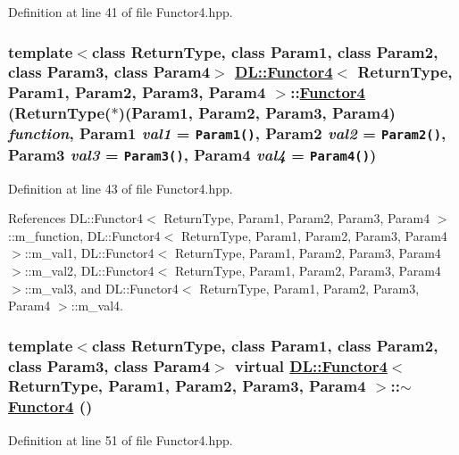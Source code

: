 Definition at line 41 of file Functor4.hpp.\hypertarget{classDL_1_1Functor4_a0}{
\subsubsection[Functor4]{\setlength{\rightskip}{0pt plus 5cm}template$<$class Return\-Type, class Param1, class Param2, class Param3, class Param4$>$ \hyperlink{classDL_1_1Functor4}{DL::Functor4}$<$ Return\-Type, Param1, Param2, Param3, Param4 $>$::\hyperlink{classDL_1_1Functor4}{Functor4} (Return\-Type($\ast$)(Param1, Param2, Param3, Param4) {\em function}, Param1 {\em val1} = {\tt Param1()}, Param2 {\em val2} = {\tt Param2()}, Param3 {\em val3} = {\tt Param3()}, Param4 {\em val4} = {\tt Param4()})}}
\label{classDL_1_1Functor4_a0}




Definition at line 43 of file Functor4.hpp.

References DL::Functor4$<$ Return\-Type, Param1, Param2, Param3, Param4 $>$::m\_\-function, DL::Functor4$<$ Return\-Type, Param1, Param2, Param3, Param4 $>$::m\_\-val1, DL::Functor4$<$ Return\-Type, Param1, Param2, Param3, Param4 $>$::m\_\-val2, DL::Functor4$<$ Return\-Type, Param1, Param2, Param3, Param4 $>$::m\_\-val3, and DL::Functor4$<$ Return\-Type, Param1, Param2, Param3, Param4 $>$::m\_\-val4.\hypertarget{classDL_1_1Functor4_a1}{
\subsubsection[$\sim$Functor4]{\setlength{\rightskip}{0pt plus 5cm}template$<$class Return\-Type, class Param1, class Param2, class Param3, class Param4$>$ virtual \hyperlink{classDL_1_1Functor4}{DL::Functor4}$<$ Return\-Type, Param1, Param2, Param3, Param4 $>$::$\sim$\hyperlink{classDL_1_1Functor4}{Functor4} ()}}
\label{classDL_1_1Functor4_a1}




Definition at line 51 of file Functor4.hpp.

